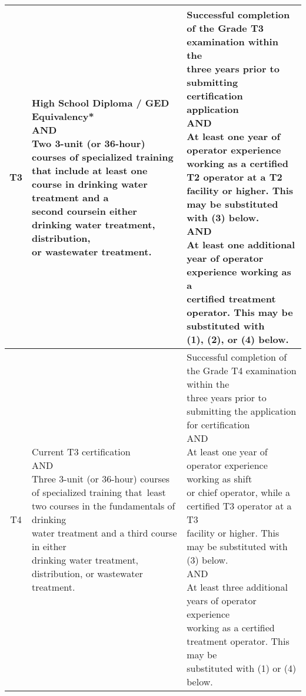 \begin{table}[H]
\begin{tabular}{|c|p{7.1cm}|p{7cm}|}
\hline
T3    & \makecell[l]{High School Diploma / GED Equivalency*\\AND\\Two 3-unit (or 36-hour) courses of specialized training\\that include at least one course in drinking water treatment and a \\second coursein either drinking water treatment, distribution,\\or wastewater treatment.}& \makecell[l]{Successful completion of the Grade T3 examination within the\\three years prior to   submitting certification application\\AND\\At least one year of operator experience working as a   certified\\T2 operator at a T2 facility or higher. This may be substituted\\with (3) below.\\AND\\      At least one additional year of operator experience working as a\\certified treatment operator. This may be substituted with\\(1), (2), or (4) below.}\\  
\hline                               
T4    & \makecell[l]{Current T3 certification\\AND\\Three 3-unit (or 36-hour) courses of specialized training that\ least two courses in the fundamentals of drinking\\water treatment and a third course in either\\drinking water treatment, distribution, or wastewater treatment.} & \makecell[l]{Successful completion of the Grade T4 examination within the\\three years prior to submitting the application\\for certification\\AND\\At least one year of operator experience working as shift\\or chief operator, while a certified T3 operator at a T3\\facility or   higher. This may be substituted with (3) below.\\AND\\At least three additional years of operator experience\\working as a certified treatment operator. This may be\\substituted with (1) or (4) below.}\\

\end{tabular}
\end{table}
